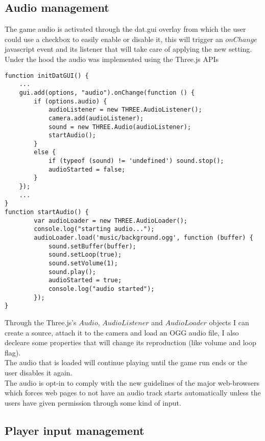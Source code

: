 \documentclass[a4paper,11pt]{article}
\begin{document}
\subsection{Audio management}
The game audio is activated through the dat.gui overlay from which the user could use a checkbox to easily enable or disable it, this will trigger an $onChange$ javascript event and its listener that will take care of applying the new setting.\\
Under the hood the audio was implemented using the Three.js APIs
\begin{verbatim}
function initDatGUI() {
    ...
    gui.add(options, "audio").onChange(function () {
        if (options.audio) {
            audioListener = new THREE.AudioListener();
            camera.add(audioListener);
            sound = new THREE.Audio(audioListener);
            startAudio();
        }
        else {
            if (typeof (sound) != 'undefined') sound.stop();
            audioStarted = false;
        }
    });
    ...
}
function startAudio() {
        var audioLoader = new THREE.AudioLoader();
        console.log("starting audio...");
        audioLoader.load('music/background.ogg', function (buffer) {
            sound.setBuffer(buffer);
            sound.setLoop(true);
            sound.setVolume(1);
            sound.play();
            audioStarted = true;
            console.log("audio started");
        });
}
\end{verbatim}
Through the Three.js's $Audio$, $AudioListener$ and $AudioLoader$ objects I can create a source, attach it to the camera and load an OGG audio file, I also decleare some properties that will change its reproduction (like volume and loop flag).\\
The audio that is loaded will continue playing until the game run ends or the user disables it again.\\
The audio is opt-in to comply with the new guidelines of the major web-browsers which forces web pages to not have an audio track starts automatically unless the users have given permission through some kind of input.
\subsection{Player input management}
\end{document}
